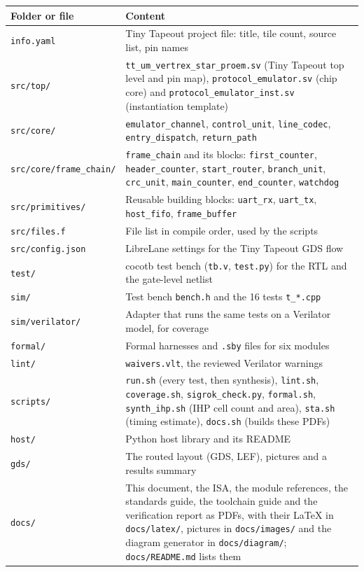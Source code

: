 \documentclass[11pt,a4paper]{article}
\newcommand{\sig}[1]{\texttt{#1}}
\begin{document}
\begin{center}
\begin{tabularx}{\linewidth}{@{}l>{\raggedright\arraybackslash}X@{}}
\toprule
Folder or file & Content \\
\midrule
\sig{info.yaml} & Tiny Tapeout project file: title, tile count, source list, pin names \\
\sig{src/top/} & \sig{tt\_um\_vertrex\_star\_proem.sv} (Tiny Tapeout top level and pin map), \sig{protocol\_emulator.sv} (chip core) and \sig{protocol\_emulator\_inst.sv} (instantiation template) \\
\sig{src/core/} & \sig{emulator\_channel}, \sig{control\_unit}, \sig{line\_codec}, \sig{entry\_dispatch}, \sig{return\_path} \\
\sig{src/core/frame\_chain/} & \sig{frame\_chain} and its blocks: \sig{first\_counter}, \sig{header\_counter}, \sig{start\_router}, \sig{branch\_unit}, \sig{crc\_unit}, \sig{main\_counter}, \sig{end\_counter}, \sig{watchdog} \\
\sig{src/primitives/} & Reusable building blocks: \sig{uart\_rx}, \sig{uart\_tx}, \sig{host\_fifo}, \sig{frame\_buffer} \\
\sig{src/files.f} & File list in compile order, used by the scripts \\
\sig{src/config.json} & LibreLane settings for the Tiny Tapeout GDS flow \\
\sig{test/} & cocotb test bench (\sig{tb.v}, \sig{test.py}) for the RTL and the gate-level netlist \\
\sig{sim/} & Test bench \sig{bench.h} and the 16 tests \sig{t\_*.cpp} \\
\sig{sim/verilator/} & Adapter that runs the same tests on a Verilator model, for coverage \\
\sig{formal/} & Formal harnesses and \sig{.sby} files for six modules \\
\sig{lint/} & \sig{waivers.vlt}, the reviewed Verilator warnings \\
\sig{scripts/} & \sig{run.sh} (every test, then synthesis), \sig{lint.sh}, \sig{coverage.sh}, \sig{sigrok\_check.py}, \sig{formal.sh}, \sig{synth\_ihp.sh} (IHP cell count and area), \sig{sta.sh} (timing estimate), \sig{docs.sh} (builds these PDFs) \\
\sig{host/} & Python host library and its README \\
\sig{gds/} & The routed layout (GDS, LEF), pictures and a results summary \\
\sig{docs/} & This document, the ISA, the module references, the standards guide, the toolchain guide and the verification report as PDFs, with their LaTeX in \sig{docs/latex/}, pictures in \sig{docs/images/} and the diagram generator in \sig{docs/diagram/}; \sig{docs/README.md} lists them \\
\bottomrule
\end{tabularx}
\end{center}
\end{document}
